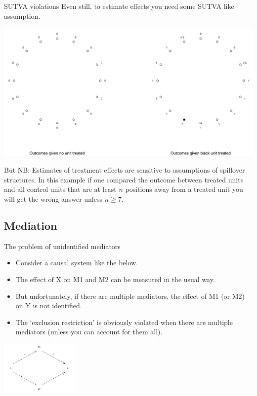 \documentclass[
  11pt,
  ignorenonframetext,
]{beamer}
\providecommand{\tightlist}{%
  \setlength{\itemsep}{0pt}\setlength{\parskip}{0pt}}\usepackage{longtable,booktabs,array}
\begin{document}
\begin{frame}{SUTVA violations}
\protect\hypertarget{sutva-violations-2}{}
Even still, to estimate effects you need some SUTVA like assumption.

\includegraphics[width=22.92in,height=\textheight]{figs/neelan.png}

But NB: Estimates of treatment effects are sensitive to assumptions of
spillover structures. In this example if one compared the outcome
between treated units and all control units that are at least \(n\)
positions away from a treated unit you will get the wrong answer unless
\(n \geq 7\).
\end{frame}

\hypertarget{mediation}{%
\subsection{\texorpdfstring{Mediation\label{mediation}}{Mediation}}\label{mediation}}

\begin{frame}{The problem of unidentified mediators}
\protect\hypertarget{the-problem-of-unidentified-mediators}{}
\begin{itemize}
\tightlist
\item
  Consider a causal system like the below.
\item
  The effect of X on M1 and M2 can be measured in the usual way.
\item
  But unfortunately, if there are multiple mediators, the effect of M1
  (or M2) on Y is not identified.
\item
  The `exclusion restriction' is obviously violated when there are
  multiple mediators (unless you can account for them all).
\end{itemize}

\includegraphics[width=1.49in,height=\textheight]{figs/med1.png}
\end{frame}
\end{document}
